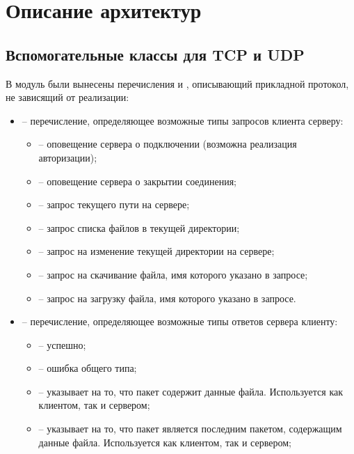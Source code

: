 \newpage

\section{Описание архитектур}


\subsection{Вспомогательные классы для TCP и UDP}

В модуль  были вынесены перечисления  и , описывающий прикладной протокол, не зависящий от реализации:
\begin{itemize}
	\item {} -- перечисление, определяющее возможные типы запросов клиента серверу:
	\begin{itemize}
		\item {} -- оповещение сервера о подключении (возможна реализация авторизации);
		\item {} -- оповещение сервера о закрытии соединения;
		\item {} -- запрос текущего пути на сервере;
		\item {} -- запрос списка файлов в текущей директории;
		\item {} -- запрос на изменение текущей директории на сервере;
		\item {} -- запрос на скачивание файла, имя которого указано в запросе;
		\item {} -- запрос на загрузку файла, имя которого указано в запросе.
	\end{itemize}
	\item {} -- перечисление, определяющее возможные типы ответов сервера клиенту:
	\begin{itemize}
		\item {} -- успешно;
		\item {} -- ошибка общего типа;
		\item {} -- указывает на то, что пакет содержит данные файла. Используется как клиентом, так и сервером;
		\item {} -- указывает на то, что пакет является последним пакетом, содержащим данные файла. Используется как клиентом, так и сервером;

\end{itemize}
\end{itemize}
